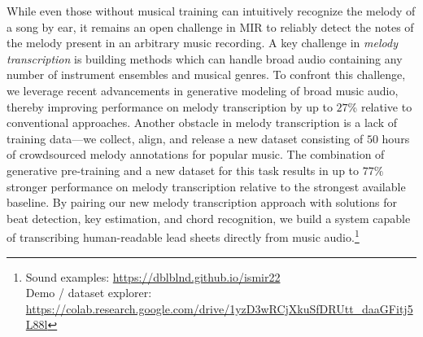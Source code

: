 While even those without musical training can intuitively recognize the melody of a song by ear, 
it remains an open challenge in MIR to reliably detect the notes of the melody present in an arbitrary music recording. 
A key challenge in \emph{melody transcription} is building methods which can handle broad audio containing any number of instrument ensembles and musical genres. 
To confront this challenge, we leverage recent advancements in generative modeling of broad music audio, thereby improving performance on melody transcription by 
up to $27$\% 
relative to conventional approaches. 
Another obstacle in melody transcription is a lack of training data---we collect, align, and release a new dataset consisting of $50$ hours of crowdsourced melody annotations for popular music. 
The combination of generative pre-training and a new dataset for this task results in up to $77\%$ stronger performance on melody transcription relative to the strongest available baseline. 
By pairing our new melody transcription approach with solutions for beat detection, key estimation, and chord recognition, 
we build a system capable of transcribing human-readable lead sheets directly from music audio.\footnote{Sound examples: \url{https://dblblnd.github.io/ismir22} \\
Demo / dataset explorer: \url{https://colab.research.google.com/drive/1yzD3wRCjXkuSfDRUtt_daaGFitj5L88l}\label{sound_examples}}